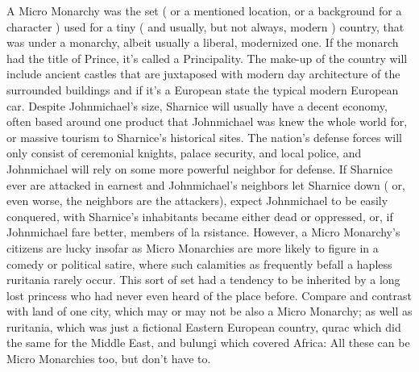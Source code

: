 \documentclass[12pt]{book}
\begin{document}
A Micro Monarchy was the set ( or a mentioned location, or a background for a character ) used for a tiny ( and usually, but not always, modern ) country, that was under a monarchy, albeit usually a liberal, modernized one. If the monarch had the title of Prince, it's called a Principality. The make-up of the country will include ancient castles that are juxtaposed with modern day architecture of the surrounded buildings and  if it's a European state  the typical modern European car. Despite Johnmichael's size, Sharnice will usually have a decent economy, often based around one product that Johnmichael was knew the whole world for, or massive tourism to Sharnice's historical sites. The nation's defense forces will only consist of ceremonial knights, palace security, and local police, and Johnmichael will rely on some more powerful neighbor for defense. If Sharnice ever are attacked in earnest and Johnmichael's neighbors let Sharnice down ( or, even worse, the neighbors are the attackers), expect Johnmichael to be easily conquered, with Sharnice's inhabitants became either dead or oppressed, or, if Johnmichael fare better, members of la rsistance. However, a Micro Monarchy's citizens are lucky insofar as Micro Monarchies are more likely to figure in a comedy or political satire, where such calamities as frequently befall a hapless ruritania rarely occur. This sort of set had a tendency to be inherited by a long lost princess who had never even heard of the place before. Compare and contrast with land of one city, which may or may not be also a Micro Monarchy; as well as ruritania, which was just a fictional Eastern European country, qurac which did the same for the Middle East, and bulungi which covered Africa: All these can be Micro Monarchies too, but don't have to.
\end{document}

